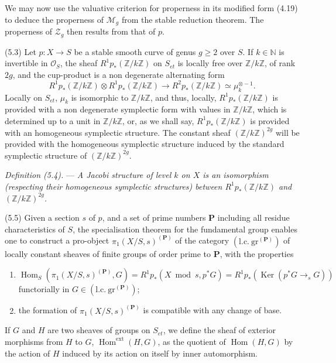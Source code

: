 \documentclass[10pt]{article}
\newcommand{\Hom}{\operatorname{Hom}}
\newcommand{\cO}{\mathcal O}
\begin{document}
We may now use the valuative criterion for properness in its modified form (4.19) to deduce the properness of $\mathcal M_g$ from the stable reduction theorem. The properness of $\mathcal Z_g$ then results from that of $p$.

\medskip
\noindent(5.3) Let $p:X\to S$ be a stable smooth curve of genus $g\geq2$ over $S$. If $k\in\mathbb N$ is invertible in $\cO_S$, the sheaf $R^1p_*(\mathbb Z/k\mathbb Z)$ on $S_{et}$ is locally free over $\mathbb Z/k\mathbb Z$, of rank $2g$, and the cup-product is a non degenerate alternating form
\[
R^1p_*(\mathbb Z/k\mathbb Z)\otimes R^1p_*(\mathbb Z/k\mathbb Z)
\longrightarrow R^2p_*(\mathbb Z/k\mathbb Z)\simeq\mu_k^{\otimes -1}.
\]
Locally on $S_{et}$, $\mu_k$ is isomorphic to $\mathbb Z/k\mathbb Z$, and thus, locally, $R^1p_*(\mathbb Z/k\mathbb Z)$ is provided with a non degenerate symplectic form with values in $\mathbb Z/k\mathbb Z$, which is determined up to a unit in $\mathbb Z/k\mathbb Z$, or, as we shall say, $R^1p_*(\mathbb Z/k\mathbb Z)$ is provided with an homogeneous symplectic structure. The constant sheaf $(\mathbb Z/k\mathbb Z)^{2g}$ will be provided with the homogeneous symplectic structure induced by the standard symplectic structure of $(\mathbb Z/k\mathbb Z)^{2g}$.

\medskip
\noindent\emph{Definition (5.4).} --- \emph{A Jacobi structure of level $k$ on $X$ is an isomorphism (respecting their homogeneous symplectic structures) between $R^1p_*(\mathbb Z/k\mathbb Z)$ and $(\mathbb Z/k\mathbb Z)^{2g}$.}

\medskip
\noindent(5.5) Given a section $s$ of $p$, and a set of prime numbers $\mathbf P$ including all residue characteristics of $S$, the specialisation theorem for the fundamental group enables one to construct a pro-object $\pi_1(X/S,s)^{(\mathbf P)}$ of the category $(\mathrm{l.c.}\ \mathrm{gr}^{(\mathbf P)})$ of locally constant sheaves of finite groups of order prime to $\mathbf P$, with the properties
\begin{enumerate}[label=(\roman*)]
\item $\Hom_S(\pi_1(X/S,s)^{(\mathbf P)},G)=R^1p_*(X\bmod s,p^*G)=R^1p_*(\operatorname{Ker}(p^*G\to_s G))$ functorially in $G\in(\mathrm{l.c.}\ \mathrm{gr}^{(\mathbf P)})$;
\item the formation of $\pi_1(X/S,s)^{(\mathbf P)}$ is compatible with any change of base.
\end{enumerate}

If $G$ and $H$ are two sheaves of groups on $S_{et}$, we define the sheaf of exterior morphisms from $H$ to $G$, $\Hom^{\mathrm{ext}}(H,G)$, as the quotient of $\Hom(H,G)$ by the action of $H$ induced by its action on itself by inner automorphism.
\end{document}
